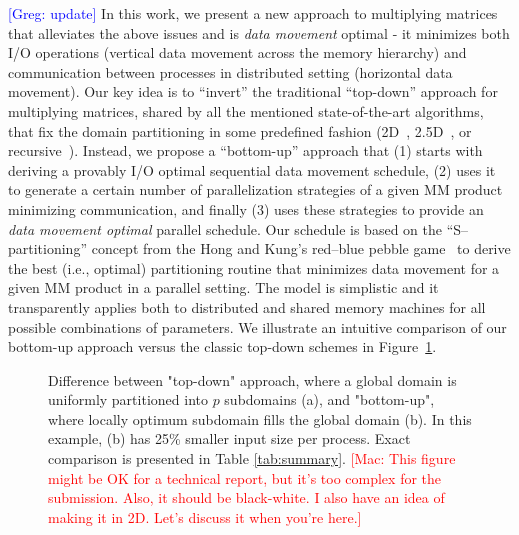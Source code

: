 \documentclass[sigplan,review,anonymous]{acmart}\settopmatter{printfolios=true,printccs=false,printacmref=false}
\newcommand\greg[1]{\textcolor{blue}{[Greg: #1]}}
\newcommand\mac[1]{\textcolor{red}{[Mac: #1]}}
\begin{document}
\greg{update}
In this work, we present a new approach to multiplying matrices that alleviates
the above issues and is \emph{data movement} optimal - it minimizes both I/O 
operations (vertical data movement across the memory hierarchy) and 
communication between processes in distributed setting (horizontal data 
movement). Our key idea is to ``invert'' the traditional ``top-down''
approach for multiplying matrices, shared by all the mentioned state-of-the-art
algorithms, that fix the domain partitioning in some predefined fashion
(2D~\cite{Cannon}, 2.5D~\cite{25d}, or
recursive~\cite{CARMA}).
%
Instead, we propose a ``bottom-up'' approach that (1) starts with deriving a
provably I/O optimal sequential data movement schedule, (2) uses it to generate 
a 
certain
number of parallelization strategies of a given MM product minimizing 
communication, and finally (3)
uses these strategies to provide an \emph{data movement optimal} parallel 
schedule.
%
Our schedule is based on the ``S--partitioning'' concept from the Hong and 
Kung's 
red--blue
pebble game~\cite{redblue} to derive the best (i.e., optimal) partitioning
routine that minimizes data movement for a given MM product in a parallel
setting. The model is simplistic and it transparently applies both to 
distributed and shared memory machines for all possible combinations of 
parameters.
%
We illustrate an intuitive comparison of our bottom-up approach versus the
classic top-down schemes in Figure~\ref{fig:topdown-vs-bottomup}.

\begin{figure}[!tbp]
\centering
%
%
\hfill
%
%
\caption{Difference between "top-down" approach, where a global domain is
uniformly partitioned into $p$ subdomains (a), and "bottom-up", where locally
optimum subdomain fills the global domain (b). In this example, (b) has 25\%
smaller input size per process. Exact comparison is presented in Table 
\ref{tab:summary}. \mac{This figure might be OK for a technical report,
but it's too complex for the submission. Also, it should be black-white.
I also have an idea of making it in 2D. Let's discuss it when you're here.}}
%
\label{fig:topdown-vs-bottomup}
\end{figure}
\end{document}

